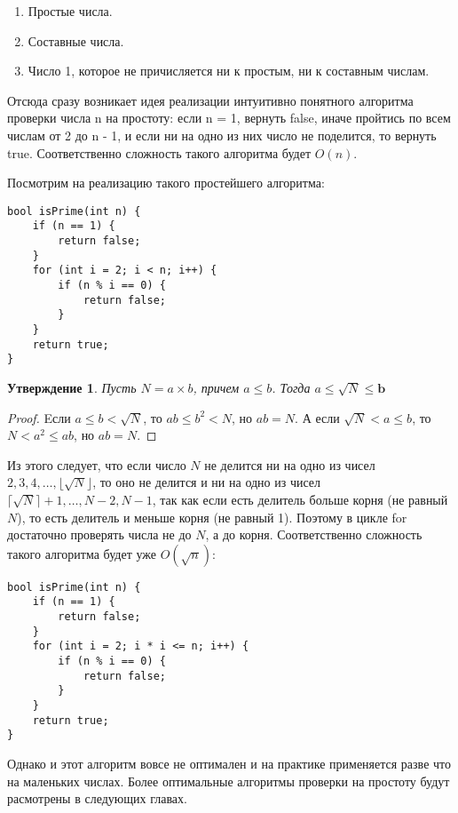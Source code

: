 \documentclass[12pt, a4paper, openany]{book}
\newtheorem*{statement}{Утверждение}
\begin{document}
\begin{enumerate}
    \item Простые числа.
    \item Составные числа.
    \item Число 1, которое не причисляется ни к простым, ни к составным числам.
\end{enumerate}

Отсюда сразу возникает идея реализации интуитивно понятного алгоритма проверки числа n на простоту: если n = 1, вернуть false, иначе пройтись по всем числам от 2 до n - 1, и если ни на одно из них число не поделится, то вернуть true. Соответственно сложность такого алгоритма будет $O({n})$.

\newpage
\noindent
Посмотрим на реализацию такого простейшего алгоритма:

\begin{lstlisting}
bool isPrime(int n) {
    if (n == 1) {
        return false;
    }
    for (int i = 2; i < n; i++) {
        if (n % i == 0) {
            return false;
        }
    }
    return true;
}
\end{lstlisting}

\begin{statement}
Пусть $N=a \times b$, причем $a \leq b$. Тогда $a \leq \sqrt{N} \leq \boldsymbol{b}$
\end{statement}

\begin{proof}
Eсли $a \leq b<\sqrt{N}$, то $a b \leq b^2<N$, но $a b=N$. А если $\sqrt{N}<a \leq b$, то $N<a^2 \leq a b$, но $a b=N$.
\end{proof}

Из этого следует, что если число $N$ не делится ни на одно из чисел $2,3,4, \ldots,\lfloor\sqrt{N}\rfloor$, то оно не делится и ни на одно из чисел $\lceil\sqrt{N}\rceil+1, \ldots, N-2, N-1$, так как если есть делитель больше корня (не равный $N$), то есть делитель и меньше корня (не равный 1). Поэтому в цикле for достаточно проверять числа не до $N$, а до корня. Соответственно сложность такого алгоритма будет уже $O(\sqrt{n})$:

\begin{lstlisting}
bool isPrime(int n) {
    if (n == 1) {
        return false;
    }
    for (int i = 2; i * i <= n; i++) {
        if (n % i == 0) {
            return false;
        }
    }
    return true;
}
\end{lstlisting}

Однако и этот алгоритм вовсе не оптимален и на практике применяется разве что на маленьких числах. Более оптимальные алгоритмы проверки на простоту будут расмотрены в следующих главах.
\end{document}
